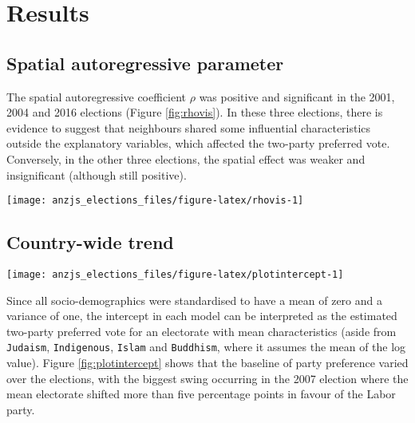 \documentclass[
  times, doublespace]{anzsauth}
\let\origfigure\figure
\let\endorigfigure\endfigure
\renewenvironment{figure}[1][2] {
    \expandafter\origfigure\expandafter[htbp]
} {
    \endorigfigure
}
\begin{document}
\hypertarget{results}{%
\section{Results}\label{results}}

\hypertarget{spatial-autoregressive-parameter}{%
\subsection{Spatial autoregressive parameter}\label{spatial-autoregressive-parameter}}

The spatial autoregressive coefficient \(\rho\) was positive and significant in the 2001, 2004 and 2016 elections (Figure \ref{fig:rhovis}). In these three elections, there is evidence to suggest that neighbours shared some influential characteristics outside the explanatory variables, which affected the two-party preferred vote. Conversely, in the other three elections, the spatial effect was weaker and insignificant (although still positive).

\begin{figure}[h]

{\centering \texttt{[image: anzjs\_elections\_files/figure-latex/rhovis-1]} 

}

\caption{Estimates of the spatial autoregressive parameter for each of the six elections, reported with their individual 95\% confidence intervals. In 2001, 2004 and 2016 there was a significant spatial component.}\label{fig:rhovis}
\end{figure}

\hypertarget{country-wide-trend}{%
\subsection{Country-wide trend}\label{country-wide-trend}}

\begin{figure}[h]

{\centering \texttt{[image: anzjs\_elections\_files/figure-latex/plotintercept-1]} 

}

\caption{Estimated intercept for each election, which represents the two-party preferred vote for an electorate with mean characteristics.}\label{fig:plotintercept}
\end{figure}

Since all socio-demographics were standardised to have a mean of zero and a variance of one, the intercept in each model can be interpreted as the estimated two-party preferred vote for an electorate with mean characteristics (aside from \texttt{Judaism}, \texttt{Indigenous}, \texttt{Islam} and \texttt{Buddhism}, where it assumes the mean of the log value). Figure \ref{fig:plotintercept} shows that the baseline of party preference varied over the elections, with the biggest swing occurring in the 2007 election where the mean electorate shifted more than five percentage points in favour of the Labor party.
\end{document}
